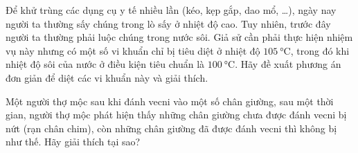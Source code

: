 \begin{ex}
	Để khử trùng các dụng cụ y tế nhiều lần (kéo, kẹp gắp, dao mổ, \dots), ngày nay người ta thường sấy chúng trong lò sấy ở nhiệt độ cao. Tuy nhiên, trước đây người ta thường phải luộc chúng trong nước sôi. Giả sử cần phải thực hiện nhiệm vụ này nhưng có một số vi khuẩn chỉ bị tiêu diệt ở nhiệt độ $\SI{105}{\celsius}$, trong đó khi nhiệt độ sôi của nước ở điều kiện tiêu chuẩn là $\SI{100}{\celsius}$. Hãy đề xuất phương án đơn giản để diệt các vi khuẩn này và giải thích.
\end{ex}
\begin{ex}
Một người thợ mộc sau khi đánh vecni vào một số chân giường, sau một thời gian, người thợ mộc phát hiện thấy những chân giường chưa được đánh vecni bị nứt (rạn chân chim), còn những chân giường đã được đánh vecni thì không bị như thế. Hãy giải thích tại sao?
\end{ex}
\begin{ex}
\end{ex}
